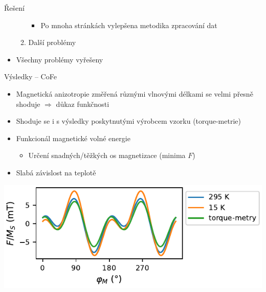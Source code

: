 \documentclass{beamer}
\begin{document}
\begin{frame}{Řešení}
\begin{itemize}
\begin{enumerate}
{\begin{itemize}
                        \item<7-> Po mnoha stránkách vylepšena metodika zpracování dat
                \end{itemize}}
            \item<8-> Další problémy
            \end{enumerate}
        \item<10-> Všechny problémy vyřešeny
    \end{itemize}
\end{frame}



\begin{frame}{Výsledky -- CoFe}
    \begin{itemize}
        \item Magnetická anizotropie změřená různými vlnovými délkami se velmi přesně shoduje $\Rightarrow$ důkaz funkčnosti
            \pause
        \item Shoduje se i s výsledky poskytnutými výrobcem vzorku (torque-metrie)
            \pause
        \item Funkcionál magnetické volné energie
            \begin{itemize}
                \item Určení snadných/těžkých os magnetizace (minima $F$)
            \end{itemize}
        \item<4> Slabá závislost na teplotě
    \end{itemize}
    \includegraphics{img/cofe-funkcional.pdf}    
\end{frame}
\end{document}
